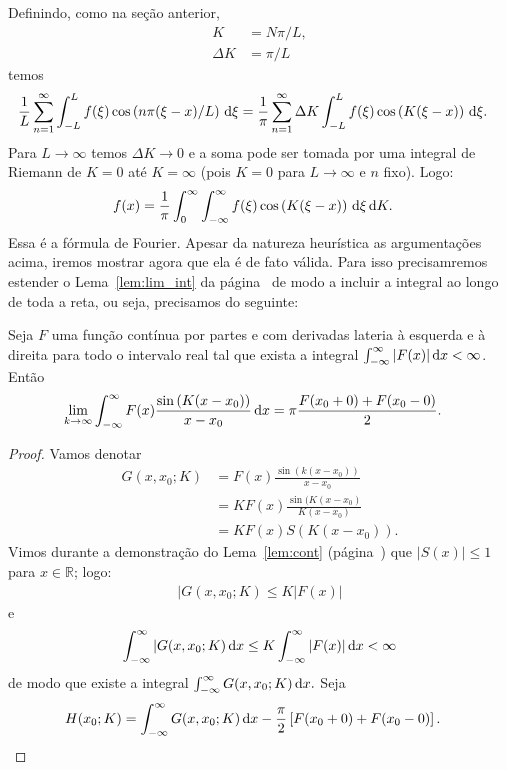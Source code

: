 Definindo, como na seção anterior,
\begin{align*}
    K &= N \pi / L, \\
    \Delta K &= \pi / L
\end{align*}
temos
\begin{align*}
    \frac{1}{L} \sum_{n = 1}^\infty \int_{-L}^L f(\xi) \cos\left( n \pi (\xi -
    x) / L \right) \, \mathrm{d}\xi &= \frac{1}{\pi} \sum_{n = 1}^\infty \Delta K
    \int_{-L}^L f(\xi) \cos\left( K(\xi - x) \right) \, \mathrm{d}\xi.
\end{align*}
Para $L \to \infty$ temos $\Delta K \to 0$ e a soma pode ser tomada por uma
integral de Riemann de $K = 0$ até $K = \infty$ (pois $K = 0$ para $L \to
\infty$ e $n$ fixo). Logo:
\begin{align*}
    f(x) &= \frac{1}{\pi} \int_0^\infty \int_{-\infty}^\infty f(\xi) \cos\left(
    K(\xi - x) \right) \, \mathrm{d}\xi \, \mathrm{d}K.
\end{align*}
Essa é a fórmula de Fourier. Apesar da natureza heurística as
argumentações acima, iremos mostrar agora que ela é de fato
válida. Para isso precisamremos estender o Lema~\ref{lem:lim_int} da
página~\pageref{lem:lim_int} de modo a incluir a integral ao longo de toda a
reta, ou seja, precisamos do seguinte:
\begin{lem}
    Seja $F$ uma função contínua por partes e com derivadas lateria
    \`{a} esquerda e \`{a} direita para todo o intervalo real tal que exista a
    integral $\int_{-\infty}^\infty |F(x)| \, \mathrm{d}x < \infty$. Então
    \begin{align*}
        \lim_{k \to \infty} \int_{-\infty}^\infty F(x) \frac{\sin\left( K(x -
        x_0)
        \right)}{ x - x_0} \, \mathrm{d}x &= \pi \frac{F(x_0 + 0) + F(x_0 - 0)}{2}.
    \end{align*}
\end{lem}
\begin{proof}
    Vamos denotar
    \begin{align*}
        G(x, x_0; K) &= F(x) \frac{\sin\left( k (x - x_0) \right)}{x - x_0} \\
        &= K F(x) \frac{\sin(K (x - x_0)}{K (x - x_0)} \\
        &= K F(x) S\left( K(x - x_0) \right).
    \end{align*}
    Vimos durante a demonstração do Lema~\ref{lem:cont}
    (página~\pageref{lem:cont}) que $|S(x)| \leq 1$ para $x \in \mathbb{R}$;
    logo:
    \begin{align*}
        |G(x, x_0; K) \leq K|F(x)|
    \end{align*}
    e
    \begin{align*}
        \int_{-\infty}^\infty |G(x, x_0; K) \, \mathrm{d}x \leq K \int_{-\infty}^\infty
        |F(x)| \, \mathrm{d}x < \infty
    \end{align*}
    de modo que existe a integral $\int_{-\infty}^\infty G(x, x_0; K) \, \mathrm{d}x.$
    Seja
    \begin{align*}
        H(x_0; K) &= \int_{-\infty}^\infty G(x, x_0; K) \, \mathrm{d}x -
        \frac{\pi}{2} \left[ F(x_0 + 0) + F(x_0 - 0) \right].
    \end{align*}
\end{proof}

